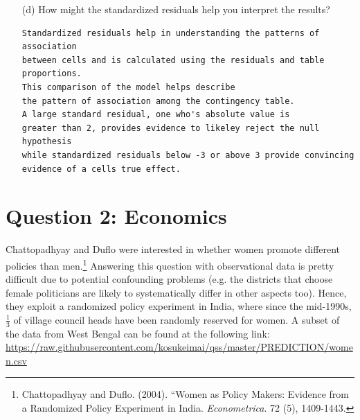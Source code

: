\documentclass[12pt,letterpaper]{article}
\begin{document}
\begin{enumerate}
	\item [(d)] How might the standardized residuals help you interpret the results?  
\begin{Verbatim}
Standardized residuals help in understanding the patterns of association 
between cells and is calculated using the residuals and table proportions. 
This comparison of the model helps describe 
the pattern of association among the contingency table.
A large standard residual, one who's absolute value is 
greater than 2, provides evidence to likeley reject the null hypothesis 
while standardized residuals below -3 or above 3 provide convincing 
evidence of a cells true effect.   
\end{Verbatim}
\end{enumerate}
\newpage

\section*{Question 2: Economics}
Chattopadhyay and Duflo were interested in whether women promote different policies than men.\footnote{Chattopadhyay and Duflo. (2004). ``Women as Policy Makers: Evidence from a Randomized Policy Experiment in India. \textit{Econometrica}. 72 (5), 1409-1443.} Answering this question with observational data is pretty difficult due to potential confounding problems (e.g. the districts that choose female politicians are likely to systematically differ in other aspects too). Hence, they exploit a randomized policy experiment in India, where since the mid-1990s, $\frac{1}{3}$ of village council heads have been randomly reserved for women. A subset of the data from West Bengal can be found at the following link: \url{https://raw.githubusercontent.com/kosukeimai/qss/master/PREDICTION/women.csv}\\
\end{document}
